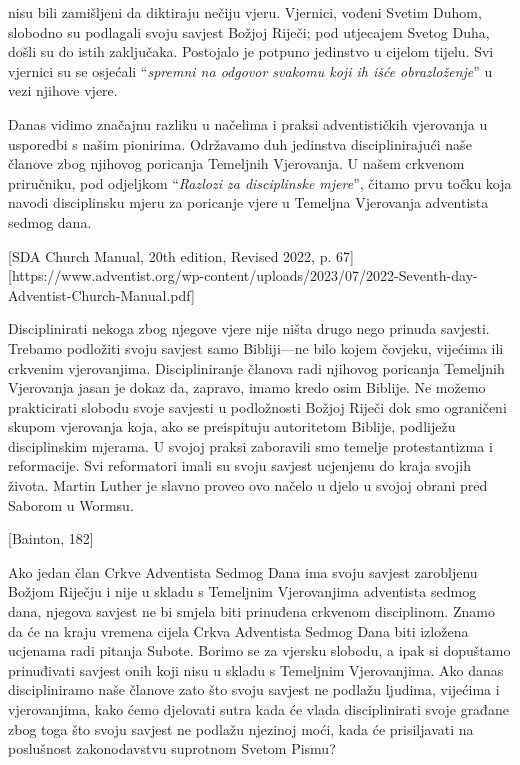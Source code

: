  nisu bili zamišljeni da diktiraju nečiju vjeru. Vjernici, vođeni Svetim Duhom, slobodno su podlagali svoju savjest Božjoj Riječi; pod utjecajem Svetog Duha, došli su do istih zaključaka. Postojalo je potpuno jedinstvo u cijelom tijelu. Svi vjernici su se osjećali “\textit{spremni na odgovor svakomu koji ih išće obrazloženje}” u vezi njihove vjere.

Danas vidimo značajnu razliku u načelima i praksi adventističkih vjerovanja u usporedbi s našim pionirima. Održavamo duh jedinstva disciplinirajući naše članove zbog njihovog poricanja Temeljnih Vjerovanja. U našem crkvenom priručniku, pod odjeljkom “\textit{Razlozi za disciplinske mjere}”, čitamo prvu točku koja navodi disciplinsku mjeru za poricanje vjere u Temeljna Vjerovanja adventista sedmog dana.


[SDA Church Manual, 20th edition, Revised 2022, p. 67][https://www.adventist.org/wp-content/uploads/2023/07/2022-Seventh-day-Adventist-Church-Manual.pdf]

Disciplinirati nekoga zbog njegove vjere nije ništa drugo nego prinuda savjesti. Trebamo podložiti svoju savjest samo Bibliji—ne bilo kojem čovjeku, vijećima ili crkvenim vjerovanjima. Discipliniranje članova radi njihovog poricanja Temeljnih Vjerovanja jasan je dokaz da, zapravo, imamo kredo osim Biblije. Ne možemo prakticirati slobodu svoje savjesti u podložnosti Božjoj Riječi dok smo ograničeni skupom vjerovanja koja, ako se preispituju autoritetom Biblije, podliježu disciplinskim mjerama. U svojoj praksi zaboravili smo temelje protestantizma i reformacije. Svi reformatori imali su svoju savjest ucjenjenu do kraja svojih života. Martin Luther je slavno proveo ovo načelo u djelo u svojoj obrani pred Saborom u Wormsu.

[Bainton, 182]

Ako jedan član Crkve Adventista Sedmog Dana ima svoju savjest zarobljenu Božjom Riječju i nije u skladu s Temeljnim Vjerovanjima adventista sedmog dana, njegova savjest ne bi smjela biti prinuđena crkvenom disciplinom. Znamo da će na kraju vremena cijela Crkva Adventista Sedmog Dana biti izložena ucjenama radi pitanja Subote. Borimo se za vjersku slobodu, a ipak si dopuštamo prinuđivati savjest onih koji nisu u skladu s Temeljnim Vjerovanjima. Ako danas discipliniramo naše članove zato što svoju savjest ne podlažu ljudima, vijećima i vjerovanjima, kako ćemo djelovati sutra kada će vlada disciplinirati svoje građane zbog toga što svoju savjest ne podlažu njezinoj moći, kada će prisiljavati na poslušnost zakonodavstvu suprotnom Svetom Pismu?

